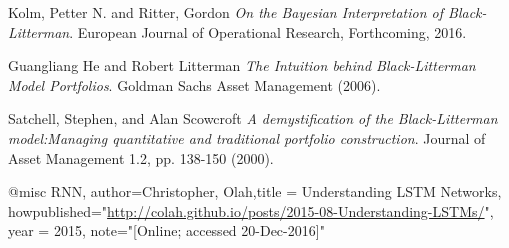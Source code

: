 \documentclass[12pt]{article}
\numberwithin{equation}{section}
\begin{document}
\begin{thebibliography}{}

Kolm, Petter N. and Ritter, Gordon
\textit{On the Bayesian Interpretation of Black-Litterman}. 
European Journal of Operational Research, Forthcoming, 2016.

Guangliang He and Robert Litterman
\textit{The Intuition behind Black-Litterman Model Portfolios}. 
{Goldman Sachs Asset Management} (2006).

Satchell, Stephen, and Alan Scowcroft
\textit{A demystification of the Black-Litterman model:Managing quantitative and traditional portfolio construction}. 
{Journal of Asset Management 1.2, pp. 138-150} (2000).

@misc {RNN, author={Christopher, Olah},title = {{Understanding LSTM Networks}},
  howpublished="\url{http://colah.github.io/posts/2015-08-Understanding-LSTMs/}",
  year = {2015}, note="[Online; accessed 20-Dec-2016]"
}




\end{thebibliography}
\end{document}

